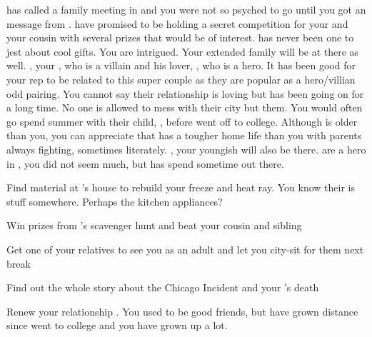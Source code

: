 \documentclass[char]{LRSguildcamp1}
\begin{document}
\cGrandma{} has called a family meeting in \pCityGrandma{} and you were not so psyched to go until you got an message from \cGrandma{}. \cGrandma{\they} have promised to be holding a secret competition for your and your cousin with several prizes that would be of interest. \cGrandma{} has never been one to jest about cool gifts. You are intrigued.  Your extended family will be at there as well. \cOldest{}, your \cOldest{\uncle}, who is a villain and his lover, \cOS{}, who is a hero. It has been good for your rep to be related to this super couple as they are popular as a hero/villian odd pairing. You cannot say their relationship is loving but has been going on for a long time. No one is allowed to mess with their city but them.  You would often go spend summer with their child, \cGrad{}, before \cGrad{\they} went off to college. Although \cGrad{} is older than you, you can appreciate that \cGrad{} has a tougher home life than you with parents always fighting, sometimes literately. \cYoungest{}, your youngish \cYoungest{\uncle} will also be there.  are a hero in \pCityYoungest{}, you did not seem \cYoungest{\them} much, but \cTween{} has spend sometime out there. 



 
\begin{itemz}[Goals]
	\item Find material at \cGrandma{}'s house to rebuild your freeze and heat ray. You know their is stuff somewhere. Perhaps the kitchen appliances? 
		\item Win prizes from \cGrandma{}'s scavenger hunt and beat your cousin and sibling
		\item Get one of your relatives to see you as an adult and let you city-sit for them next break
		\item Find out the whole story about the Chicago Incident and your \cAS{\parent}'s death
		\item Renew your relationship \cGrad{}. You used to be good friends, but have grown distance since \cGrad{} went to college and you have grown up a lot.
\end{itemz}
\end{document}
